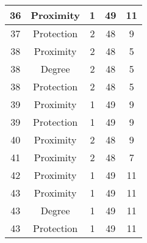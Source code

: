 \documentclass[results.tex]{subfiles}
\begin{document}
\begin{center}
\begin{tabular}{| c || c | c | c | c |}
            \hline
            36                      & Proximity                    & 1                      & 49                      & 11                   \\
            \hline
            37                      & Protection                   & 2                      & 48                      & 9                    \\
            \hline
            38                      & Proximity                    & 2                      & 48                      & 5                    \\
            \hline
            38                      & Degree                       & 2                      & 48                      & 5                    \\
            \hline
            38                      & Protection                   & 2                      & 48                      & 5                    \\
            \hline
            39                      & Proximity                    & 1                      & 49                      & 9                    \\
            \hline
            39                      & Protection                   & 1                      & 49                      & 9                    \\
            \hline
            40                      & Proximity                    & 2                      & 48                      & 9                    \\
            \hline
            41                      & Proximity                    & 2                      & 48                      & 7                    \\
            \hline
            42                      & Proximity                    & 1                      & 49                      & 11                   \\
            \hline
            43                      & Proximity                    & 1                      & 49                      & 11                   \\
            \hline
            43                      & Degree                       & 1                      & 49                      & 11                   \\
            \hline
            43                      & Protection                   & 1                      & 49                      & 11                   \\

\end{tabular}
\end{center}
\end{document}
